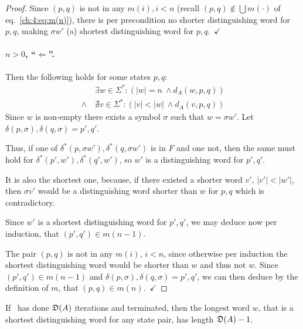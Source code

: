\begin{proof}
Since $(p,q)$ is not in any $m(i), i<n$ (recall $(p,q) \notin \bigcup{m(\cdot)}$ of eq.~\ref{ch:4:eq:m(n)}), there is per precondition no shorter distinguishing word for $p,q$, making $\sigma w'$ (a) shortest distinguishing word for $p,q$.\ $\checkmark$ 

\paragraph*{$n > 0$, ``$\Leftarrow$''.} 
Then the following holds for some states $p,q$:
\begin{align*}
&\exists w\in\Sigma^*\colon (|w| = n\ \land d_A(w, p, q))\\
\land\ &\nexists v\in\Sigma^*\colon (|v| < |w|\ \land d_A(v, p, q))
\end{align*}
Since $w$ is non-empty there exists a symbol $\sigma$ such that $w = \sigma w'$. Let $\delta(p,\sigma),\delta(q,\sigma) = p',q'$.

Thus, if one of $\delta^*(p, \sigma w'),\delta^*(q, \sigma w')$ is in $F$ and one not, then the same must hold for $\delta^*(p', w'),\delta^*(q', w')$, so $w'$ is a distinguishing word for $p',q'$.

It is also the shortest one, because, if there existed a shorter word $v'$, $|v'| < |w'|$, then $\sigma v'$ would be a distinguishing word shorter than $w$ for $p,q$ which is contradictory.

Since $w'$ is a shortest distinguishing word for $p',q'$, we may deduce now per induction, that $(p',q')\in m(n-1)$.

The pair $(p,q)$ is not in any $m(i)$, $i<n$, since otherwise per induction the shortest distinguishing word would be shorter than $w$ and thus not $w$. Since $(p',q')\in m(n-1)$ and $\delta(p,\sigma),\delta(q,\sigma) = p',q'$, we can then deduce by the definition of $m$, that $(p,q)\in m(n)$.\ $\checkmark$ 
\end{proof}

\begin{lemma}\label{ch:4:semantics-of-D(A)}
    If \CompDist\ has done $\mathfrak{D}(A)$ iterations and terminated, then the longest word $w$, that is a shortest distinguishing word for any state pair, has length $\mathfrak{D}(A)-1$.
\end{lemma}

